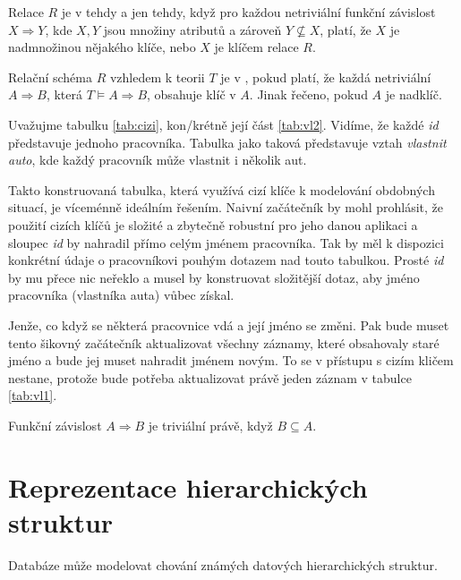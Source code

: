 \begin{uptheorem}
Relace $R$ je v  tehdy a jen tehdy, když pro každou netriviální funkční závislost $X \Rightarrow Y$, kde $X, Y$ jsou množiny atributů a zároveň $Y \nsubseteq X$, platí, že $X$ je nadmnožinou nějakého klíče, nebo $X$ je klíčem relace $R$. 
\end{uptheorem}

\begin{uptheorem}
Relační schéma $R$ vzhledem k teorii $T$ je v , pokud platí, že každá netriviální $A \Rightarrow B$, která  $T \vDash A \Rightarrow B$, obsahuje klíč v $A$. Jinak řečeno, pokud $A$ je nadklíč.
\end{uptheorem}

\begin{upexample}
Uvažujme tabulku \ref{tab:cizi}, kon\-/krétně její část \ref{tab:vl2}. Vidíme, že každé \textit{id} představuje jednoho pracovníka. Tabulka jako taková představuje vztah \textit{vlastnit auto}, kde každý pracovník může vlastnit i několik aut.

Takto konstruovaná tabulka, která využívá cizí klíče k modelování obdobných situací, je víceménně ideálním řešením. Naivní začátečník by mohl prohlásit, že použití cizích klíčů je složité a zbytečně robustní pro jeho danou aplikaci a sloupec \textit{id} by nahradil přímo celým jménem pracovníka. Tak by měl k dispozici konkrétní údaje o pracovníkovi pouhým dotazem nad touto tabulkou. Prosté \textit{id} by mu přece nic neřeklo a musel by konstruovat složitější dotaz, aby jméno pracovníka (vlastníka auta) vůbec získal.

Jenže, co když se některá pracovnice vdá a její jméno se změni. Pak bude muset tento šikovný začátečník aktualizovat všechny záznamy, které obsahovaly staré jméno a bude jej muset nahradit jménem novým. To se v přístupu s cizím kličem nestane, protože bude potřeba aktualizovat právě jeden záznam v tabulce \ref{tab:vl1}.
\end{upexample}

\begin{upquote}
Funkční závislost $A \Rightarrow B$ je triviální právě, když $B \subseteq A$.
\end{upquote}

\section{Reprezentace hierarchických struktur}
Databáze může modelovat chování známých datových hierarchických struktur.

